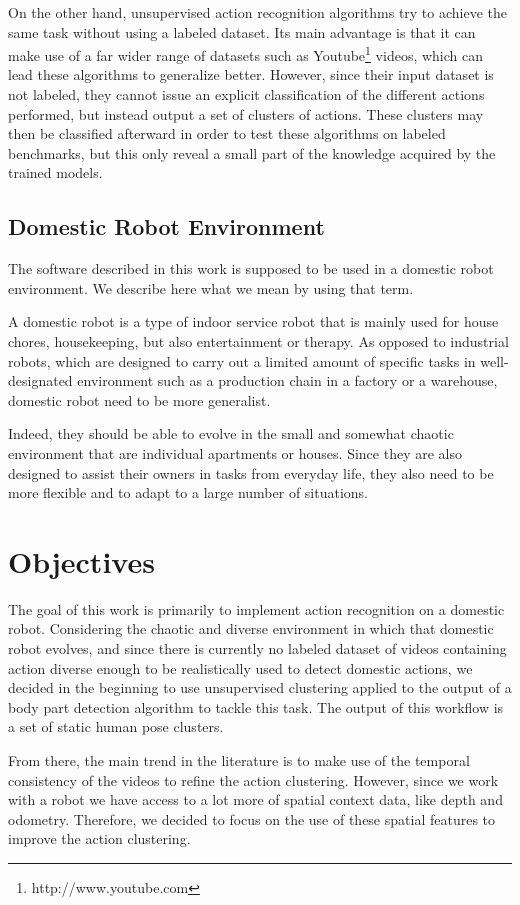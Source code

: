 On the other hand, unsupervised action recognition algorithms try to achieve the same task without using a labeled dataset. Its main advantage is that it can make use of a far wider range of datasets such as Youtube\footnote{http://www.youtube.com} videos, which can lead these algorithms to generalize better. However, since their input dataset is not labeled, they cannot issue an explicit classification of the different actions performed, but instead output a set of clusters of actions. These clusters may then be classified afterward in order to test these algorithms on labeled benchmarks, but this only reveal a small part of the knowledge acquired by the trained models.

\subsection{Domestic Robot Environment}
The software described in this work is supposed to be used in a domestic robot environment. We describe here what we mean by using that term.

A domestic robot is a type of indoor service robot that is mainly used for house chores, housekeeping, but also entertainment or therapy.
As opposed to industrial robots, which are designed to carry out a limited amount of specific tasks in well-designated environment such as a production chain in a factory or a warehouse, domestic robot need to be more generalist.

Indeed, they should be able to evolve in the small and somewhat chaotic environment that are individual apartments or houses. Since they are also designed to assist their owners in tasks from everyday life, they also need to be more flexible and to adapt to a large number of situations.

\section{Objectives}
The goal of this work is primarily to implement action recognition on a domestic robot. Considering the chaotic and diverse environment in which that domestic robot evolves, and since there is currently no labeled dataset of videos containing action diverse enough to be realistically used to detect domestic actions, we decided in the beginning to use unsupervised clustering applied to the output of a body part detection algorithm to tackle this task. The output of this workflow is a set of static human pose clusters. 

From there, the main trend in the literature is to make use of the temporal consistency of the videos to refine the action clustering. However, since we work with a robot we have access to a lot more of spatial context data, like depth and odometry. Therefore, we decided to focus on the use of these spatial features to improve the action clustering.

